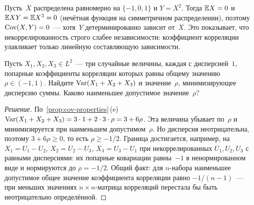 \begin{example}[Некоррелированные, но зависимые: $Y = X^2$]
\label{ex:uncorrelated-dependent}
Пусть~$X$ распределена равномерно на $\{-1, 0, 1\}$ и $Y = X^2$. Тогда $\mathbb{E} X = 0$ и $\mathbb{E} XY = \mathbb{E} X^3 = 0$ (нечётная функция на симметричном распределении), поэтому $\operatorname{Cov}(X, Y) = 0$~--- хотя~$Y$ детерминированно зависит от~$X$. Это показывает, что некоррелированность строго слабее независимости: коэффициент корреляции улавливает только линейную составляющую зависимости.
\end{example}

\begin{problem}
\label{prob:variance-of-sum-correlated}
Пусть $X_1, X_2, X_3 \in L^2$~--- три случайные величины, каждая с дисперсией~$1$, попарные коэффициенты корреляции которых равны общему значению $\rho \in (-1, 1)$. Найдите $\operatorname{Var}(X_1 + X_2 + X_3)$ и значение~$\rho$, минимизирующее дисперсию суммы. Каково наименьшее допустимое значение~$\rho$?
\end{problem}

\begin{proof}[Решение]
По~\cref{prop:cov-properties}\,(e) $\operatorname{Var}(X_1 + X_2 + X_3) = 3 \cdot 1 + 2 \cdot 3 \cdot \rho = 3 + 6\rho$. Эта величина убывает по~$\rho$ и минимизируется при наименьшем допустимом~$\rho$. Но дисперсия неотрицательна, поэтому $3 + 6\rho \geq 0$, то есть $\rho \geq -1/2$. Граница достигается, например, на $X_1 = U_1 - U_2$, $X_2 = U_2 - U_3$, $X_3 = U_3 - U_1$ при некоррелированных $U_1, U_2, U_3$ с равными дисперсиями: их попарные ковариации равны~$-1$ в ненормированном виде и нормируются до $\rho = -1/2$. Общий факт: для $n$-набора наименьшее допустимое общее значение коэффициента корреляции равно $-1/(n - 1)$~--- при меньших значениях $n \times n$-матрица корреляций перестала бы быть неотрицательно определённой.
\end{proof}
